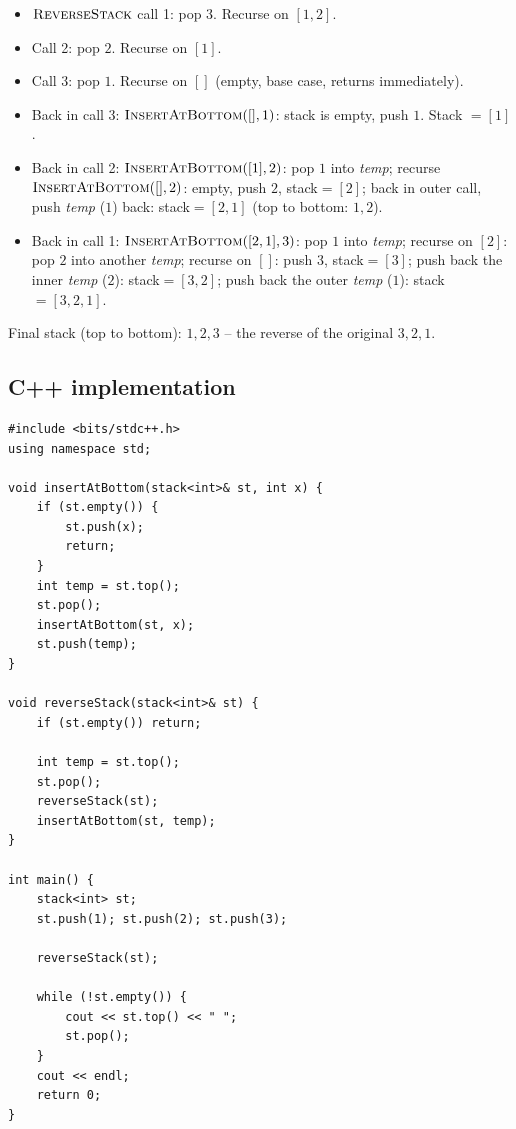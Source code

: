 
\begin{itemize}
  \item $\textsc{ReverseStack}$ call 1: pop $3$. Recurse on $[1,2]$.
  \item Call 2: pop $2$. Recurse on $[1]$.
  \item Call 3: pop $1$. Recurse on $[]$ (empty, base case, returns
        immediately).
  \item Back in call 3: $\textsc{InsertAtBottom}([], 1)$: stack is
        empty, push $1$. Stack $=[1]$.
  \item Back in call 2: $\textsc{InsertAtBottom}([1], 2)$: pop $1$ into
        \textit{temp}; recurse $\textsc{InsertAtBottom}([], 2)$: empty,
        push $2$, stack$=[2]$; back in outer call, push \textit{temp}
        ($1$) back: stack$=[2,1]$ (top to bottom: $1,2$).
  \item Back in call 1: $\textsc{InsertAtBottom}([2,1], 3)$: pop $1$
        into \textit{temp}; recurse on $[2]$: pop $2$ into another
        \textit{temp}; recurse on $[]$: push $3$, stack$=[3]$; push
        back the inner \textit{temp} ($2$): stack$=[3,2]$; push back
        the outer \textit{temp} ($1$): stack$=[3,2,1]$.
\end{itemize}

Final stack (top to bottom): $1,2,3$ -- the reverse of the original
$3,2,1$.

\subsection*{C++ implementation}

\begin{lstlisting}
#include <bits/stdc++.h>
using namespace std;

void insertAtBottom(stack<int>& st, int x) {
    if (st.empty()) {
        st.push(x);
        return;
    }
    int temp = st.top();
    st.pop();
    insertAtBottom(st, x);
    st.push(temp);
}

void reverseStack(stack<int>& st) {
    if (st.empty()) return;

    int temp = st.top();
    st.pop();
    reverseStack(st);
    insertAtBottom(st, temp);
}

int main() {
    stack<int> st;
    st.push(1); st.push(2); st.push(3);

    reverseStack(st);

    while (!st.empty()) {
        cout << st.top() << " ";
        st.pop();
    }
    cout << endl;
    return 0;
}
\end{lstlisting}

